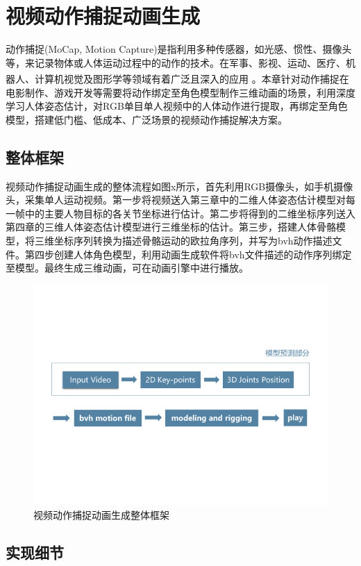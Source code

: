 
\chapter{视频动作捕捉动画生成}
动作捕捉(MoCap, Motion Capture)是指利用多种传感器，如光感、惯性、摄像头等，来记录物体或人体运动过程中的动作的技术。在军事、影视、运动、医疗、机器人、计算机视觉及图形学等领域有着广泛且深入的应用\textsuperscript{\cite{p14}} 。本章针对动作捕捉在电影制作、游戏开发等需要将动作绑定至角色模型制作三维动画的场景，利用深度学习人体姿态估计，对RGB单目单人视频中的人体动作进行提取，再绑定至角色模型，搭建低门槛、低成本、广泛场景的视频动作捕捉解决方案。

\section{整体框架}

视频动作捕捉动画生成的整体流程如图x所示，首先利用RGB摄像头，如手机摄像头，采集单人运动视频。第一步将视频送入第三章中的二维人体姿态估计模型对每一帧中的主要人物目标的各关节坐标进行估计。第二步将得到的二维坐标序列送入第四章的三维人体姿态估计模型进行三维坐标的估计。第三步，搭建人体骨骼模型，将三维坐标序列转换为描述骨骼运动的欧拉角序列，并写为bvh动作描述文件。第四步创建人体角色模型，利用动画生成软件将bvh文件描述的动作序列绑定至模型。最终生成三维动画，可在动画引擎中进行播放。
\begin{figure}[h]
	\centering
	\includegraphics[scale=1]{figures/27.png}
	\caption{视频动作捕捉动画生成整体框架}
	\label{fig:f27}
\end{figure}

\section{实现细节}
